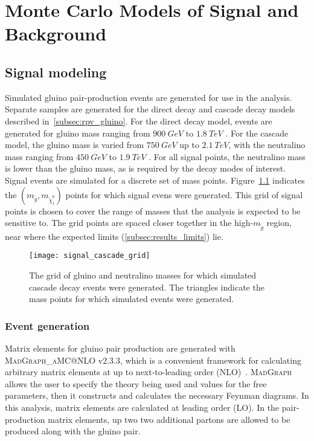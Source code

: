 \chapter{Monte Carlo Models of Signal and Background} \label{ch:monte_carlo}

\section{Signal modeling}\label{sec:signal_modeling}

Simulated gluino pair-production events are generated for use in the analysis.
Separate samples are generated for the direct decay and cascade decay models described in~\ref{subsec:rpv_gluino}.
For the direct decay model, events are generated for gluino mass ranging from $900~GeV$ to $1.8~TeV$ .
For the cascade model, the gluino mass is varied from $750~GeV$ up to $2.1~TeV$, with the neutralino mass ranging from $450~GeV$ to $1.9~TeV$ .
For all signal points, the neutralino mass is lower than the gluino mass, as is required by the decay modes of interest.
Signal events are simulated for a discrete set of mass points.
Figure~\ref{fig:signal_cascade_grid} indicates the $\left(m_{\tilde{g}}, m_{\tilde{\chi}_1^0}\right)$ points for which signal evens were generated.
This grid of signal points is chosen to cover the range of masses that the analysis is expected to be sensitive to.
The grid points are spaced closer together in the high-$m_{\tilde{g}}$ region, near where the expected limits (\ref{subsec:results_limits}) lie.

\begin{figure}[!ht]
    \centering

    \texttt{[image: signal\_cascade\_grid]}

    \caption{The grid of gluino and neutralino masses for which simulated cascade decay events were generated.
    The triangles indicate the mass points for which simulated events were generated.}

    \label{fig:signal_cascade_grid}
\end{figure}

\subsection{Event generation}\label{subsec:signal_event_gen}

Matrix elements for gluino pair production are generated with \textsc{MadGraph\_aMC@NLO} v2.3.3, which is a convenient framework for calculating arbitrary matrix elements at up to next-to-leading order (NLO)~\cite{signal-madgraph}.
\textsc{MadGraph} allows the user to specify the theory being used and values for the free parameters, then it constructs and calculates the necessary Feynman diagrams.
In this analysis, matrix elements are calculated at leading order (LO).
In the pair-production matrix elements, up two two additional partons are allowed to be produced along with the gluino pair.

